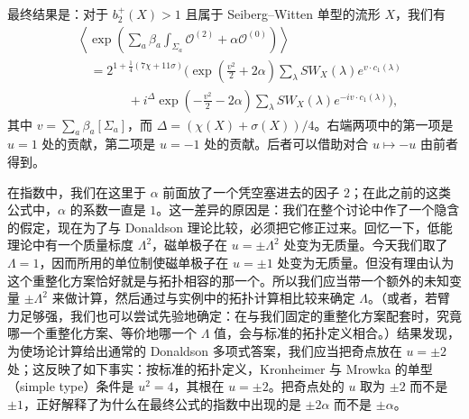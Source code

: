 最终结果是：对于 $b_2^+(X)>1$ 且属于 Seiberg--Witten 单型的流形 $X$，我们有
\[
\begin{aligned}
&\left\langle\exp\left(\sum_a\beta_a\int_{\Sigma_a}\mathcal{O}^{(2)}+\alpha\mathcal{O}^{(0)}\right)\right\rangle\\
&\quad=2^{1+\frac14(7\chi+11\sigma)}\Biggl(\exp\left(\frac{v^2}{2}+2\alpha\right)\sum_\lambda SW_X(\lambda)e^{v\cdot c_1(\lambda)}\\
&\qquad\qquad+i^{\Delta}\exp\left(-\frac{v^2}{2}-2\alpha\right)\sum_\lambda SW_X(\lambda)e^{-iv\cdot c_1(\lambda)}\Biggr),
\end{aligned}
\]
其中 $v=\sum_a\beta_a[\Sigma_a]$，而 $\Delta=(\chi(X)+\sigma(X))/4$。右端两项中的第一项是 $u=1$ 处的贡献，第二项是 $u=-1$ 处的贡献。后者可以借助对合 $u\mapsto-u$ 由前者得到。


在指数中，我们在这里于 $\alpha$ 前面放了一个凭空塞进去的因子 $2$；在此之前的这类公式中，$\alpha$ 的系数一直是 $1$。这一差异的原因是：我们在整个讨论中作了一个隐含的假定，现在为了与 Donaldson 理论比较，必须把它修正过来。回忆一下，低能理论中有一个质量标度 $\Lambda^2$，磁单极子在 $u=\pm\Lambda^2$ 处变为无质量。今天我们取了 $\Lambda=1$，因而所用的单位制使磁单极子在 $u=\pm1$ 处变为无质量。但没有理由认为这个重整化方案恰好就是与拓扑相容的那一个。所以我们应当带一个额外的未知变量 $\pm\Lambda^2$ 来做计算，然后通过与实例中的拓扑计算相比较来确定 $\Lambda$。（或者，若臂力足够强，我们也可以尝试先验地确定：在与我们固定的重整化方案配套时，究竟哪一个重整化方案、等价地哪一个 $\Lambda$ 值，会与标准的拓扑定义相合。）结果发现，为使场论计算给出通常的 Donaldson 多项式答案，我们应当把奇点放在 $u=\pm2$ 处；这反映了如下事实：按标准的拓扑定义，Kronheimer 与 Mrowka 的单型（simple type）条件是 $u^2=4$，其根在 $u=\pm2$。把奇点处的 $u$ 取为 $\pm2$ 而不是 $\pm1$，正好解释了为什么在最终公式的指数中出现的是 $\pm2\alpha$ 而不是 $\pm\alpha$。

